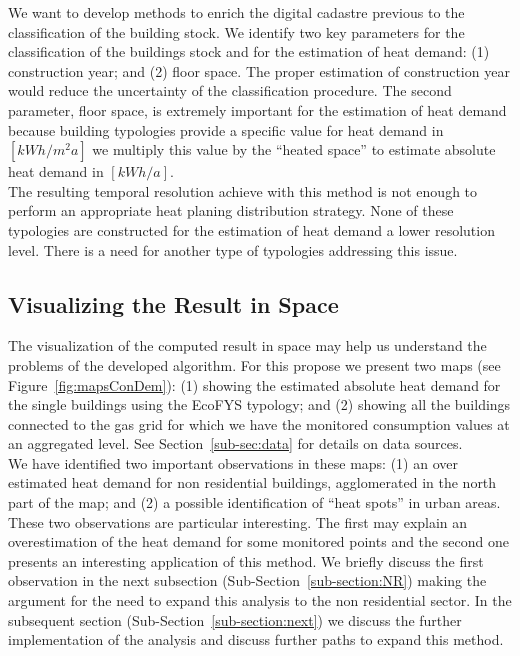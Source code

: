 \documentclass[authoryear,preprint,review,12pt]{elsarticle}
\begin{document}
\begin{linenumbers}
We want to develop methods to enrich the digital cadastre previous to the
classification of the building stock. We identify two key parameters for the
classification of the buildings stock and for the estimation of heat demand:
(1) construction year; and (2) floor space.  The proper estimation of
construction year would reduce the uncertainty of the classification procedure.
The second parameter, floor space, is extremely important for the estimation of
heat demand because building typologies provide a specific value for heat
demand in $[kWh/m^2a]$ we multiply this value by the ``heated space'' to
estimate absolute heat demand in $[kWh/a]$.\\

The resulting temporal resolution achieve with this method is not enough to
perform an appropriate heat planing distribution strategy. None of these
typologies are constructed for the estimation of heat demand a lower resolution
level. There is a need for another type of typologies addressing this issue.\\

\subsection{Visualizing the Result in Space}

The visualization of the computed result in space may help us understand the
problems of the developed algorithm.  For this propose we present two maps (see
Figure~\ref{fig:mapsConDem}): (1) showing the estimated absolute heat demand
for the single buildings using the EcoFYS typology; and (2) showing all the
buildings connected to the gas grid for which we have the monitored consumption
values at an aggregated level.  See Section~\ref{sub-sec:data} for details on
data sources.\\

We have identified two important observations in these maps: (1) an over
estimated heat demand for non residential buildings, agglomerated in the north
part of the map; and (2) a possible identification of ``heat spots'' in urban
areas.  These two observations are particular interesting. The first may
explain an overestimation of the heat demand for some monitored points
and the second one presents an interesting application of this method.  We
briefly discuss the first observation in the next subsection
(Sub-Section~\ref{sub-section:NR}) making the argument for the need to expand
this analysis to the non residential sector.  In the subsequent section
(Sub-Section~\ref{sub-section:next}) we discuss the further implementation of
the analysis and discuss further paths to expand this method.\\


\end{linenumbers}
\end{document}
